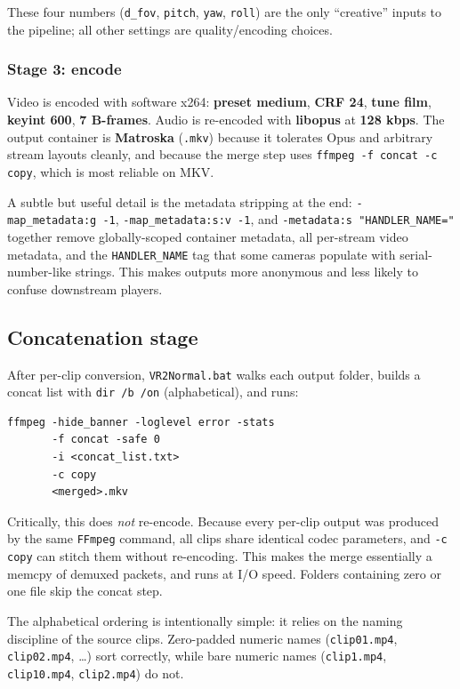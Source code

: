 \documentclass[11pt,a4paper]{article}
\begin{document}
These four numbers (\texttt{d\_fov}, \texttt{pitch}, \texttt{yaw},
\texttt{roll}) are the only ``creative'' inputs to the pipeline; all
other settings are quality/encoding choices.

\subsubsection{Stage 3: encode}

\noindent
Video is encoded with software x264:
\textbf{preset medium}, \textbf{CRF 24}, \textbf{tune film},
\textbf{keyint 600}, \textbf{7 B-frames}. Audio is re-encoded with
\textbf{libopus} at \textbf{128 kbps}. The output container is
\textbf{Matroska} (\texttt{.mkv}) because it tolerates Opus and
arbitrary stream layouts cleanly, and because the merge step uses
\texttt{ffmpeg -f concat -c copy}, which is most reliable on MKV.

A subtle but useful detail is the metadata stripping at the end:
\texttt{-map\_metadata:g~-1}, \texttt{-map\_metadata:s:v~-1}, and
\texttt{-metadata:s~"HANDLER\_NAME="} together remove globally-scoped
container metadata, all per-stream video metadata, and the
\texttt{HANDLER\_NAME} tag that some cameras populate with
serial-number-like strings. This makes outputs more anonymous and less
likely to confuse downstream players.

\subsection{Concatenation stage}

\noindent
After per-clip conversion, \texttt{VR2Normal.bat} walks each output
folder, builds a concat list with \texttt{dir /b /on} (alphabetical),
and runs:

\begin{lstlisting}
ffmpeg -hide_banner -loglevel error -stats
       -f concat -safe 0
       -i <concat_list.txt>
       -c copy
       <merged>.mkv
\end{lstlisting}

\noindent
Critically, this does \emph{not} re-encode. Because every per-clip
output was produced by the same \texttt{FFmpeg} command, all clips
share identical codec parameters, and \texttt{-c copy} can stitch them
without re-encoding. This makes the merge essentially a memcpy of
demuxed packets, and runs at I/O speed. Folders containing zero or one
file skip the concat step.

The alphabetical ordering is intentionally simple: it relies on the
naming discipline of the source clips. Zero-padded numeric names
(\texttt{clip01.mp4}, \texttt{clip02.mp4}, \dots) sort correctly,
while bare numeric names (\texttt{clip1.mp4}, \texttt{clip10.mp4},
\texttt{clip2.mp4}) do not.
\end{document}
